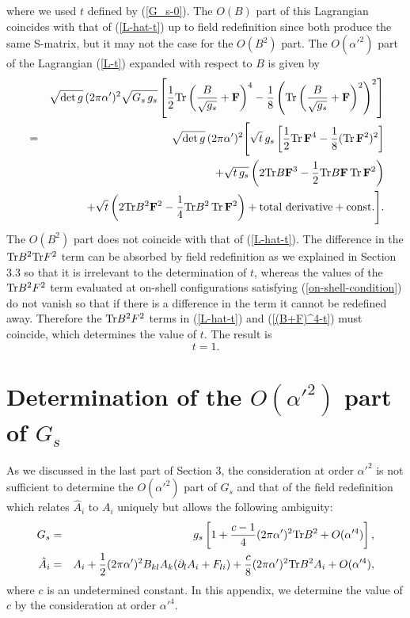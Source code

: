 \documentclass[a4paper,12pt]{article}
\begin{document}
where we used $t$ defined by (\ref{G_s-0}).
The $O(B)$ part of this Lagrangian coincides with that of
(\ref{L-hat-t}) up to field redefinition since
both produce the same S-matrix,
but it may not the case for the $O(B^2)$ part.
The $O(\alpha'^2)$ part of
the Lagrangian (\ref{L-t}) expanded with respect to $B$
is given by
\begin{eqnarray}
&& \sqrt{\det g} \, (2 \pi \alpha')^2 \sqrt{G_s \, g_s}
\left[
\frac{1}{2} {\rm Tr} \left(
\frac{B}{\sqrt{g_s}} + {\bf F} \right)^4
-\frac{1}{8} \left( {\rm Tr} \left(
\frac{B}{\sqrt{g_s}} + {\bf F} \right)^2 \right)^2
\right]
\nonumber \\
&=& \sqrt{\det g} \, (2 \pi \alpha')^2 \Biggl[
\sqrt{t} \, g_s \left[
\frac{1}{2} {\rm Tr} \, {\bf F}^4
-\frac{1}{8} ( {\rm Tr} \, {\bf F}^2 )^2 \right]
\nonumber \\
&& + \sqrt{t \, g_s} \left(
2 {\rm Tr} B {\bf F}^3
-\frac{1}{2} {\rm Tr} B {\bf F} \, {\rm Tr} \, {\bf F}^2
\right)
\nonumber \\
&& + \sqrt{t} \left(
2 {\rm Tr} B^2 {\bf F}^2
-\frac{1}{4} {\rm Tr} B^2 \, {\rm Tr} \, {\bf F}^2
\right)
+ {\rm total~derivative}
+ {\rm const.} \Biggr].
\label{(B+F)^4-t}
\end{eqnarray}
The $O(B^2)$ part does not coincide with that of (\ref{L-hat-t}).
The difference in the ${\rm Tr} B^2 {\rm Tr} F^2$ term
can be absorbed by field redefinition as we explained
in Section 3.3
so that it is irrelevant to the determination of $t$,
whereas the values of the ${\rm Tr} B^2 F^2$ term
evaluated at on-shell configurations
satisfying (\ref{on-shell-condition}) do not vanish
so that if there is a difference in the term
it cannot be redefined away.
Therefore the ${\rm Tr} B^2 F^2$ terms
in (\ref{L-hat-t}) and (\ref{(B+F)^4-t})
must coincide, which determines the value of $t$.
The result is
\begin{equation}
t=1.
\end{equation}

\section{Determination of the $O(\alpha'^2)$ part of $G_s$}
\setcounter{equation}{0}
\indent

As we discussed in the last part of Section 3,
the consideration at order $\alpha'^2$ is not sufficient
to determine the $O(\alpha'^2)$ part of $G_s$
and that of the field redefinition which relates $\hat{A}_i$
to $A_i$ uniquely but allows the following ambiguity:
\begin{eqnarray}
G_s
&=& g_s \left[
1 +\frac{c-1}{4} (2 \pi \alpha')^2
{\rm Tr} B^2 + O(\alpha'^4)
\right],
\label{G_s-c}
\\
\hat{A}_i &=& A_i + \frac{1}{2} (2 \pi \alpha')^2
B_{kl} A_k (\partial_l A_i + F_{li})
+ \frac{c}{8} (2 \pi \alpha')^2 {\rm Tr} B^2 A_i
+ O(\alpha'^4),
\label{A-hat-c}
\end{eqnarray}
where $c$ is an undetermined constant.
In this appendix, we determine the value of $c$
by the consideration at order $\alpha'^4$.
\end{document}
